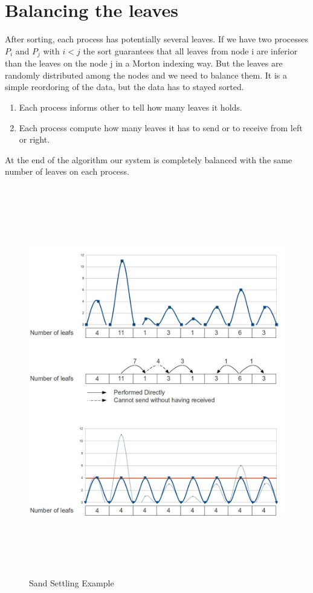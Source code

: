 \documentclass[12pt,letterpaper,titlepage]{report}
\begin{document}
\section{Balancing the leaves}
After sorting, each process has potentially several leaves.
If we have two processes $P_{i}$ and $P_{j}$ with $i < j$ the sort guarantees that all leaves from node i are inferior than the leaves on the node j in a Morton indexing way.
But the leaves are randomly distributed among the nodes and we need to balance them.
It is a simple reordoring of the data, but the data has to stayed sorted.

\begin{enumerate}
\item Each process informs other to tell how many leaves it holds.
\item Each process compute how many leaves it has to send or to receive from left or right.
\end{enumerate}
At the end of the algorithm our system is completely balanced with the same number of leaves on each process.

\begin{figure}[h!]
\begin{center}
\includegraphics[width=14cm, height=17cm, keepaspectratio=true]{SandSettling.png}
\caption{Sand Settling Example}
\end{center}
\end{figure}
\end{document}
